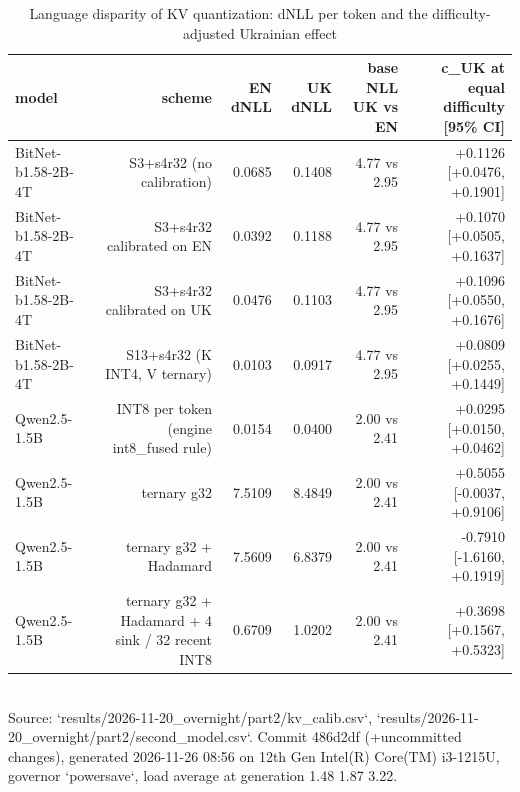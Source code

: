 \begin{table}[t]\centering\small
\caption{Language disparity of KV quantization: dNLL per token and the difficulty-adjusted Ukrainian effect}
\begin{tabular}{lrrrrr}\toprule
model & scheme & EN dNLL & UK dNLL & base NLL UK vs EN & c\_UK at equal difficulty [95\% CI] \\ \midrule
BitNet-b1.58-2B-4T & S3+s4r32 (no calibration) & 0.0685 & 0.1408 & 4.77 vs 2.95 & +0.1126 [+0.0476, +0.1901] \\
BitNet-b1.58-2B-4T & S3+s4r32 calibrated on EN & 0.0392 & 0.1188 & 4.77 vs 2.95 & +0.1070 [+0.0505, +0.1637] \\
BitNet-b1.58-2B-4T & S3+s4r32 calibrated on UK & 0.0476 & 0.1103 & 4.77 vs 2.95 & +0.1096 [+0.0550, +0.1676] \\
BitNet-b1.58-2B-4T & S13+s4r32 (K INT4, V ternary) & 0.0103 & 0.0917 & 4.77 vs 2.95 & +0.0809 [+0.0255, +0.1449] \\
Qwen2.5-1.5B & INT8 per token (engine int8\_fused rule) & 0.0154 & 0.0400 & 2.00 vs 2.41 & +0.0295 [+0.0150, +0.0462] \\
Qwen2.5-1.5B & ternary g32 & 7.5109 & 8.4849 & 2.00 vs 2.41 & +0.5055 [-0.0037, +0.9106] \\
Qwen2.5-1.5B & ternary g32 + Hadamard & 7.5609 & 6.8379 & 2.00 vs 2.41 & -0.7910 [-1.6160, +0.1919] \\
Qwen2.5-1.5B & ternary g32 + Hadamard + 4 sink / 32 recent INT8 & 0.6709 & 1.0202 & 2.00 vs 2.41 & +0.3698 [+0.1567, +0.5323] \\
\bottomrule\end{tabular}
\\[2pt]{\scriptsize Source: `results/2026-11-20\_overnight/part2/kv\_calib.csv`, `results/2026-11-20\_overnight/part2/second\_model.csv`. Commit 486d2df (+uncommitted changes), generated 2026-11-26 08:56 on 12th Gen Intel(R) Core(TM) i3-1215U, governor `powersave`, load average at generation 1.48 1.87 3.22.}
\end{table}

